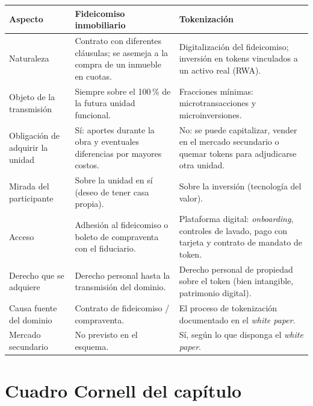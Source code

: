 \documentclass[12pt,oneside]{book}
\begin{document}
\begin{center}
\small
\begin{tabularx}{\textwidth}{
    >{\raggedright\arraybackslash}p{}
    >{\raggedright\arraybackslash}X
    >{\raggedright\arraybackslash}X
}
\toprule
\textbf{Aspecto} & \textbf{Fideicomiso inmobiliario} & \textbf{Tokenización} \\
\midrule
Naturaleza &
Contrato con diferentes cláusulas; se asemeja a la compra de un inmueble en cuotas. &
Digitalización del fideicomiso; inversión en tokens vinculados a un activo real (RWA). \\
\addlinespace
Objeto de la transmisión &
Siempre sobre el 100\,\% de la futura unidad funcional. &
Fracciones mínimas: microtransacciones y microinversiones. \\
\addlinespace
Obligación de adquirir la unidad &
Sí: aportes durante la obra y eventuales diferencias por mayores costos. &
No: se puede capitalizar, vender en el mercado secundario o quemar tokens para adjudicarse otra unidad. \\
\addlinespace
Mirada del participante &
Sobre la unidad en sí (deseo de tener casa propia). &
Sobre la inversión (tecnología del valor). \\
\addlinespace
Acceso &
Adhesión al fideicomiso o boleto de compraventa con el fiduciario. &
Plataforma digital: \textit{onboarding}, controles de lavado, pago con tarjeta y contrato de mandato de token. \\
\addlinespace
Derecho que se adquiere &
Derecho personal hasta la transmisión del dominio. &
Derecho personal de propiedad sobre el token (bien intangible, patrimonio digital). \\
\addlinespace
Causa fuente del dominio &
Contrato de fideicomiso / compraventa. &
El proceso de tokenización documentado en el \textit{white paper}. \\
\addlinespace
Mercado secundario &
No previsto en el esquema. &
Sí, según lo que disponga el \textit{white paper}. \\
\bottomrule
\end{tabularx}
\end{center}

\section{Cuadro Cornell del capítulo}
\end{document}
